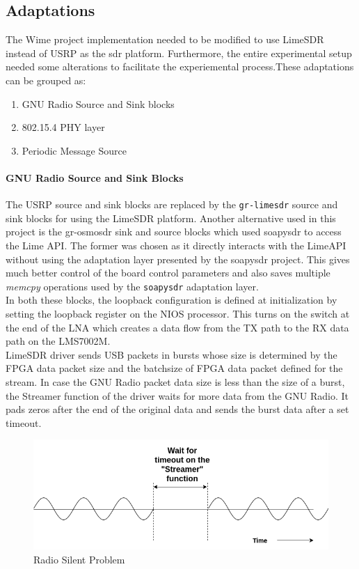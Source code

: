 \subsection{Adaptations}
The Wime project implementation needed to be modified to use LimeSDR instead of USRP as the \ac{sdr} platform.
Furthermore, the entire experimental setup needed some alterations to facilitate the experiemental process.These adaptations can be grouped as:

\begin{enumerate}
\item{GNU Radio Source and Sink blocks}
\item{802.15.4 \ac{PHY} layer}
\item{Periodic Message Source}
\end{enumerate}

\paragraph{GNU Radio Source and Sink Blocks}
The USRP source and sink blocks are replaced by the \texttt{gr-limesdr} source and sink blocks for using the LimeSDR platform.
Another alternative used in this project is the gr-osmosdr sink and source blocks which used soapysdr to access the Lime API. The former was chosen as it directly interacts with the LimeAPI without using the adaptation layer presented by the soapysdr project. This gives much better control of the board control parameters and also saves multiple \textit{memcpy} operations used by the \texttt{soapysdr} adaptation layer.\\

In both these blocks, the loopback configuration is defined at initialization by setting the loopback register on the NIOS processor.
This turns on the switch at the end of the \ac{LNA} which creates a data flow from the TX path to the RX data path on the LMS7002M.\\


LimeSDR driver sends USB packets in bursts whose size is determined by the FPGA data packet size and the batchsize of FPGA data packet defined for the stream.
In case the GNU Radio packet data size is less than the size of a burst, the Streamer function of the driver waits for more data from the GNU Radio.
It pads zeros after the end of the original data and sends the burst data after a set timeout.\\

\begin{figure}[h!]
\centering
\includegraphics[scale=0.6]{Thesis/Figure/SilentProblem.png}
\caption{Radio Silent Problem}
\label{Radio_Silent}
\end{figure}

